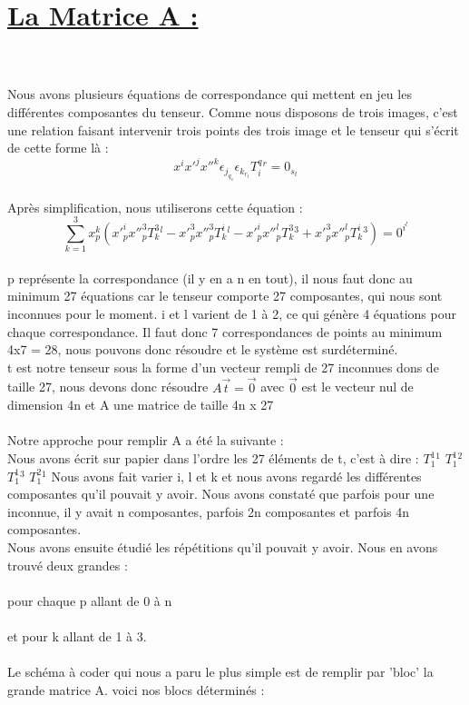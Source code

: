 \documentclass[a4paper,11pt,fleqn]{report}
\begin{document}
	\section{\underline{La Matrice A :}}
	\\\\Nous avons plusieurs \'equations de correspondance qui mettent en jeu les diff\'erentes composantes du tenseur. Comme nous disposons de trois images, c'est une relation faisant intervenir trois points des trois image et le tenseur qui s'\'ecrit de cette forme l\`a : $$x^ix'^jx''^k\epsilon_j_q_s\epsilon_k_r_tT_i^q^r = 0_s_t$$
	\\Apr\`es simplification, nous utiliserons cette \'equation :
	$$\sum \limits_{k=1}^3 x_p^k(x'_p^ix''_p^3T_k^3^l - x'_p^3x''_p^3T_k^i^l - x'_p^ix''_p^lT_k^3^3 + x'_p^3x''_p^lT_k^i^3) = 0^i^l$$
	\\p repr\'esente la correspondance (il y en a n en tout), il nous faut donc au minimum 27 \'equations car le tenseur comporte 27 composantes, qui nous sont inconnues pour le moment. i et l varient de 1 \`a 2, ce qui g\'en\`ere 4 \'equations pour chaque correspondance. Il faut donc 7 correspondances de points au minimum 4x7 = 28, nous pouvons donc r\'esoudre et le syst\`eme est surd\'etermin\'e.
	\\t est notre tenseur sous la forme d'un vecteur rempli de 27 inconnues dons de taille 27, nous devons donc r\'esoudre $A\vec{t} = \vec{0}$ avec $\vec{0}$ est le vecteur nul de dimension 4n et A une matrice de taille 4n x 27
\\
\\ Notre approche pour remplir A a \'et\'e la suivante :\\
Nous avons \'ecrit sur papier dans l'ordre les 27 \'el\'ements de t, c'est \`a dire : $T_1^1^1$ $T_1^1^2$ $T_1^1^3$ $T_1^2^1$
Nous avons fait varier i, l et k et nous avons regard\'e les diff\'erentes composantes qu'il pouvait y avoir. Nous avons constat\'e que parfois pour une inconnue, il y avait n composantes, parfois 2n composantes et parfois 4n composantes.
\\ Nous avons ensuite \'etudi\'e les r\'ep\'etitions qu'il pouvait y avoir. Nous en avons trouv\'e deux grandes : \\\\pour chaque p allant de 0 \`a n
\\\\et pour k allant de 1 \`a 3.\\\\
Le sch\'ema \`a coder qui nous a paru le plus simple est de remplir par 'bloc' la grande matrice A. voici nos blocs d\'etermin\'es :
\end{document}
